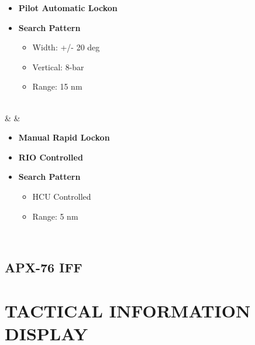 \documentclass[fontInter]{TechCheck}
\begin{document}
\begin{listlongtable}
\begin{minipage}[t]{\linewidth}
			\vspace{-7pt}
			\begin{itemize}
				\item \textbf{Pilot Automatic Lockon}
				\item \textbf{Search Pattern}
				\begin{itemize}
					\item Width: +/- 20 deg
					\item Vertical: 8-bar
					\item Range: 15 nm
				\end{itemize}
			\end{itemize}
		\end{minipage} \\
		\midrule
		\textbf{\textbullet} &  &
		\begin{minipage}[t]{\linewidth}
			\vspace{-7pt}
			\begin{itemize}
				\item \textbf{Manual Rapid Lockon}
				\item \textbf{RIO Controlled}
				\item \textbf{Search Pattern}
				\begin{itemize}
					\item HCU Controlled
					\item Range: 5 nm
				\end{itemize}
			\end{itemize}
		\end{minipage} \\
	\end{listlongtable}

	\subsection{APX-76 IFF}


	\cleardoublepage

	\section{TACTICAL INFORMATION DISPLAY}
\end{document}
